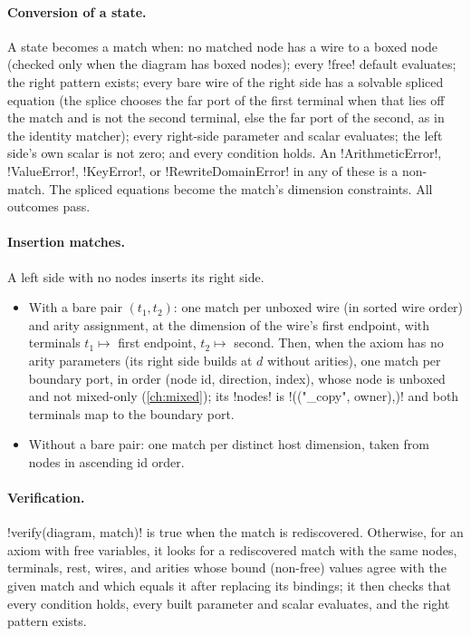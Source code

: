 \paragraph{Conversion of a state.}
A state becomes a match when: no matched node has a wire to a boxed node (checked only when the
diagram has boxed nodes); every \py!free! default evaluates; the right pattern exists; every bare
wire of the right side has a solvable spliced equation (the splice chooses the far port of the
first terminal when that lies off the match and is not the second terminal, else the far port of
the second, as in the identity matcher); every right-side parameter and scalar evaluates; the left
side's own scalar is not zero; and every condition holds. An \py!ArithmeticError!,
\py!ValueError!, \py!KeyError!, or \py!RewriteDomainError! in any of these is a non-match. The
spliced equations become the match's dimension constraints. All outcomes pass.

\paragraph{Insertion matches.}
A left side with no nodes inserts its right side.
\begin{itemize}
\item With a bare pair $(t_1,t_2)$: one match per unboxed wire (in sorted wire order) and arity
  assignment, at the dimension of the wire's first endpoint, with terminals $t_1\mapsto$ first
  endpoint, $t_2\mapsto$ second. Then, when the axiom has no arity parameters (its right side
  builds at $d$ without arities), one match per boundary port, in order (node id, direction,
  index), whose node is unboxed and not mixed-only (\cref{ch:mixed}); its \py!nodes! is
  \py!(("_copy", owner),)! and both terminals map to the boundary port.
\item Without a bare pair: one match per distinct host dimension, taken from nodes in ascending id
  order.
\end{itemize}

\paragraph{Verification.}
\py!verify(diagram, match)! is true when the match is rediscovered. Otherwise, for an axiom with
free variables, it looks for a rediscovered match with the same nodes, terminals, rest, wires, and
arities whose bound (non-free) values agree with the given match and which equals it after
replacing its bindings; it then checks that every condition holds, every built parameter and
scalar evaluates, and the right pattern exists.

